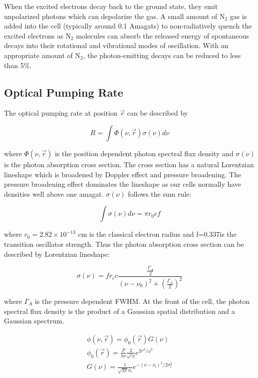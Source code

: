 When the excited electrons decay back to the ground state, they emit unpolarized photons which can depolarize the gas. A small amount of N$_{2}$ gas is added into the cell (typically around 0.1 Amagats) to non-radiatively quench the excited electrons as N$_{2}$ molecules can absorb the released energy of spontaneous decays into their rotational and vibrational modes of oscillation. With an appropriate amount of N$_{2}$, the photon-emitting decays can be reduced to less than 5\%.

\subsection{Optical Pumping Rate}

The optical pumping rate at position $\vec{r}$ can be described by

\begin{equation}
R = \int \Phi(\nu, \vec{r})\sigma(\nu)d\nu
\end{equation}

where $\Phi(\nu,\vec{r})$ is the position dependent photon spectral flux density and $\sigma(\nu)$ is the photon absorption cross section. The cross section has a natural Lorentzian lineshape which is broadened by Doppler effect and pressure broadening. The pressure broadening effect dominates the lineshape as our cells normally have densities well above one amagat. $\sigma(\nu)$ follows the sum rule:

\begin{equation}
\int\sigma(\nu)d\nu=\pi r_{0}cf
\end{equation}

where $r_{0}=2.82 \times 10^{-13}$ cm is the classical electron radius and f=0.337is the transition oscillator strength. Thus the photon absorption cross section can be described by Lorentzian lineshape:

\begin{equation}
\sigma(\nu)=fr_{e}c\frac{\frac{\Gamma_{A}}{2}}{(\nu-\nu_{0})^{2}+(\frac{\Gamma_{A}}{2})^{2}}
\end{equation}

where $\Gamma_{A}$ is the pressure dependent FWHM. At the front of the cell, the photon spectral flux density is the product of a Gaussian spatial distribution and a Gaussian spectrum.

\begin{subequations}
	\begin{gather}
	\phi(\nu,\vec{r})=\phi_{0}(\vec{r})G(\nu) \\
	\phi_{0}(\vec{r})=\frac{P}{h\nu}\frac{2}{\omega^{2}\pi}e^{2r^{2}/\omega^{2}}\\
	G(\nu)=\frac{1}{\sqrt{2\pi}\sigma_{l}}e^{-(\nu-\nu_{l})^2/2\sigma_{l}^{2}}
	\end{gather}
\end{subequations}

